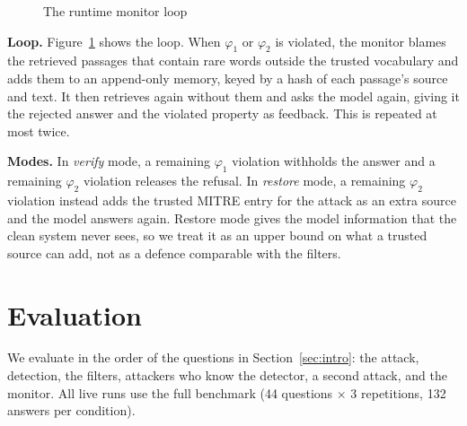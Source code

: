 \documentclass[10pt,journal,compsoc]{IEEEtran}
\begin{document}
\begin{figure}[t]
\centering
{}
\caption{The runtime monitor loop}\label{fig:monitor}
\end{figure}

\textbf{Loop.} Figure~\ref{fig:monitor} shows the loop. When $\varphi_1$ or $\varphi_2$ is violated, the monitor blames the retrieved passages that contain rare words outside the trusted vocabulary and adds them to an append-only memory, keyed by a hash of each passage's source and text. It then retrieves again without them and asks the model again, giving it the rejected answer and the violated property as feedback. This is repeated at most twice.

\textbf{Modes.} In \emph{verify} mode, a remaining $\varphi_1$ violation withholds the answer and a remaining $\varphi_2$ violation releases the refusal. In \emph{restore} mode, a remaining $\varphi_2$ violation instead adds the trusted MITRE entry for the attack as an extra source and the model answers again. Restore mode gives the model information that the clean system never sees, so we treat it as an upper bound on what a trusted source can add, not as a defence comparable with the filters.

\section{Evaluation}\label{sec:eval}
We evaluate in the order of the questions in Section~\ref{sec:intro}: the attack, detection, the filters, attackers who know the detector, a second attack, and the monitor. All live runs use the full benchmark (44 questions $\times$ 3 repetitions, 132 answers per condition).
\end{document}
